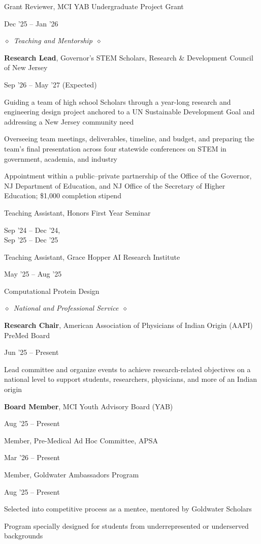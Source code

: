 \documentclass[10pt,a4paper]{article}
\newlength{\entrygap}\setlength{\entrygap}{5pt}
\newcommand{\entry}[2]{%
  \par\vspace{\entrygap}%
  \noindent
  \begin{minipage}[t]{0.795\textwidth}\raggedright #1\end{minipage}%
  \hfill
  \begin{minipage}[t]{0.19\textwidth}\raggedleft\small #2\end{minipage}%
  \par\penalty500
}
\newcommand{\subhead}[1]{%
  \par\vspace{10pt}\noindent$\diamond$\ {\fontsize{11}{13}\selectfont\itshape #1}\ $\diamond$\par\vspace{3pt}}
\begin{document}
\entry{Grant Reviewer, MCI YAB Undergraduate Project Grant}{Dec '25 -- Jan '26}

\subhead{Teaching and Mentorship}
\entry{\textbf{Research Lead}, Governor's STEM Scholars, Research \& Development Council of New Jersey}{Sep '26 -- May '27 (Expected)}
\begin{cvitems}
  \item Guiding a team of high school Scholars through a year-long research and engineering design project anchored to a UN Sustainable Development Goal and addressing a New Jersey community need
  \item Overseeing team meetings, deliverables, timeline, and budget, and preparing the team's final presentation across four statewide conferences on STEM in government, academia, and industry
  \item Appointment within a public--private partnership of the Office of the Governor, NJ Department of Education, and NJ Office of the Secretary of Higher Education; \$1,000 completion stipend
\end{cvitems}

\entry{Teaching Assistant, Honors First Year Seminar}{Sep '24 -- Dec '24,\\Sep '25 -- Dec '25}

\entry{Teaching Assistant, Grace Hopper AI Research Institute}{May '25 -- Aug '25}
\begin{cvitems}
  \item Computational Protein Design
\end{cvitems}

\subhead{National and Professional Service}
\entry{\textbf{Research Chair}, American Association of Physicians of Indian Origin (AAPI) PreMed Board}{Jun '25 -- Present}
\begin{cvitems}
  \item Lead committee and organize events to achieve research-related objectives on a national level to support students, researchers, physicians, and more of an Indian origin
\end{cvitems}

\entry{\textbf{Board Member}, MCI Youth Advisory Board (YAB)}{Aug '25 -- Present}

\entry{Member, Pre-Medical Ad Hoc Committee, APSA}{Mar '26 -- Present}

\entry{Member, Goldwater Ambassadors Program}{Aug '25 -- Present}
\begin{cvitems}
  \item Selected into competitive process as a mentee, mentored by Goldwater Scholars
  \item Program specially designed for students from underrepresented or underserved backgrounds
\end{cvitems}
\end{document}
